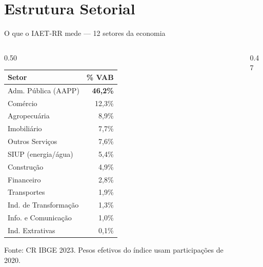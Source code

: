 \documentclass[aspectratio=169, 11pt]{beamer}
\begin{document}
\section{Estrutura Setorial}

\begin{frame}{O que o IAET-RR mede — 12 setores da economia}

  \begin{columns}[T]
    \begin{column}{0.50\textwidth}
      \small
      \renewcommand{\arraystretch}{1.25}
      \begin{tabular}{>{\raggedright}p{4.5cm} r}
        \toprule
        \textbf{Setor} & \textbf{\% VAB} \\
        \midrule
        \rowcolor{seplanblue!20}
        Adm. Pública (AAPP) & \textbf{46,2\%} \\
        Comércio & 12,3\% \\
        \rowcolor{seplanblue!10}
        Agropecuária & 8,9\% \\
        Imobiliário & 7,7\% \\
        \rowcolor{seplanblue!10}
        Outros Serviços & 7,6\% \\
        SIUP (energia/água) & 5,4\% \\
        \rowcolor{seplanblue!10}
        Construção & 4,9\% \\
        Financeiro & 2,8\% \\
        \rowcolor{seplanblue!10}
        Transportes & 1,9\% \\
        Ind. de Transformação & 1,3\% \\
        \rowcolor{seplanblue!10}
        Info. e Comunicação & 1,0\% \\
        Ind. Extrativas & 0,1\% \\
        \bottomrule
      \end{tabular}
      {\tiny Fonte: CR IBGE 2023. Pesos efetivos do índice usam participações de 2020.}
    \end{column}

    \begin{column}{0.47\textwidth}
      \centering
    \end{column}
  \end{columns}

\end{frame}
\end{document}
